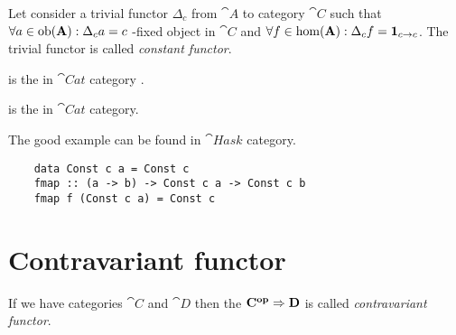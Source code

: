 \begin{definition}
  \label{def:const_functor}
  Let consider a trivial functor $\Delta_c$ from 
  $\cat{A}$ to category $\cat{C}$ such that $\forall a \in \mathrm{ob}(\mathbf{A}):
  \Delta_c a = c$ -fixed object in $\cat{C}$ and 
  $\forall f \in \mathrm{hom}(\mathbf{A}): \Delta_c f = \mathbf{1}_{ c \to c }$. The trivial
  functor is called \textit{constant functor}.
\end{definition}

\begin{example}
  \label{ex:initial_object_cat}
   is the 
  in $\cat{Cat}$ category \cite{bib:stackexchange:empty_category}.
\end{example}

\begin{example}
  \label{ex:terminal_object_cat}
   is the 
  in $\cat{Cat}$ category.
\end{example}

The good example can be found in $\cat{Hask}$ category.
\begin{example}
  \label{ex:const_functor_hask}
  \begin{verbatim}
    data Const c a = Const c
    fmap :: (a -> b) -> Const c a -> Const c b
    fmap f (Const c a) = Const c
  \end{verbatim}
\end{example}

\section{Contravariant functor}
\begin{definition}
  \label{def:contravariant_functor}
  If we have categories $\cat{C}$ and $\cat{D}$ then the
   $\mathbf{C^{op}} \Rightarrow \mathbf{D}$ is called
  \textit{contravariant functor}. 
\end{definition}

